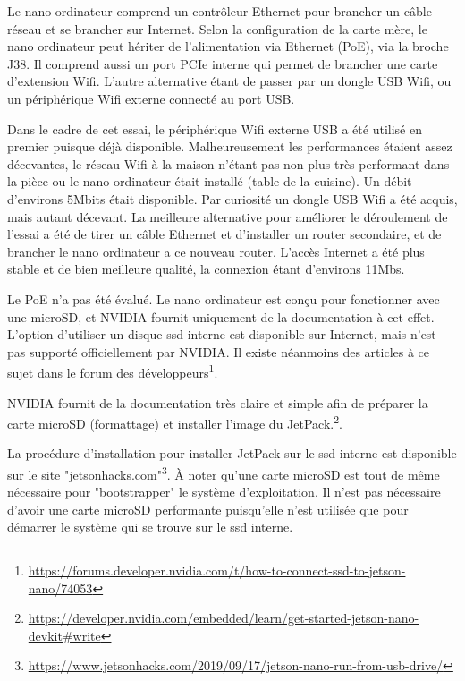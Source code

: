 \par Le nano ordinateur comprend un contrôleur Ethernet pour brancher un câble réseau et se brancher sur Internet. Selon la configuration de la carte mère, le nano ordinateur peut hériter de l'alimentation via Ethernet (PoE), via la broche J38. Il comprend aussi un port PCIe interne qui permet de brancher une carte d'extension Wifi. L'autre alternative étant de passer par un dongle USB Wifi, ou un périphérique Wifi externe connecté au port USB. 
\par Dans le cadre de cet essai, le périphérique Wifi externe USB a été utilisé en premier puisque déjà disponible. Malheureusement les performances étaient assez décevantes, le réseau Wifi à la maison n'étant pas non plus très performant dans la pièce ou le nano ordinateur était installé (table de la cuisine). Un débit d'environs 5Mbits était disponible. Par curiosité un dongle USB Wifi a été acquis, mais autant décevant. La meilleure alternative pour améliorer le déroulement de l'essai a été de tirer un câble Ethernet et d'installer un router secondaire, et de brancher le nano ordinateur a ce nouveau router. L'accès Internet a été plus stable et de bien meilleure qualité, la connexion étant d'environs 11Mbs. 
\par Le PoE n'a pas été évalué. 
Le nano ordinateur est conçu pour fonctionner avec une microSD, et NVIDIA fournit uniquement de la documentation à cet effet. L'option d'utiliser un disque \acrshort{ssd} interne est disponible sur Internet, mais n'est pas supporté officiellement par NVIDIA. Il existe néanmoins des articles à ce sujet dans le forum des développeurs\footnote{\url{https://forums.developer.nvidia.com/t/how-to-connect-ssd-to-jetson-nano/74053}}. 
\par NVIDIA fournit de la documentation très claire et simple afin de préparer la carte microSD (formattage) et installer l'image du JetPack.\footnote{\url{https://developer.nvidia.com/embedded/learn/get-started-jetson-nano-devkit#write}}.
\par La procédure d'installation pour installer JetPack sur le \acrshort{ssd} interne est disponible sur le site "jetsonhacks.com"\footnote{\url{https://www.jetsonhacks.com/2019/09/17/jetson-nano-run-from-usb-drive/}}. À noter qu'une carte microSD est tout de même nécessaire pour "bootstrapper" le système d'exploitation. Il n'est pas nécessaire d'avoir une carte microSD performante puisqu'elle n'est utilisée que pour démarrer le système qui se trouve sur le \acrshort{ssd} interne. 

